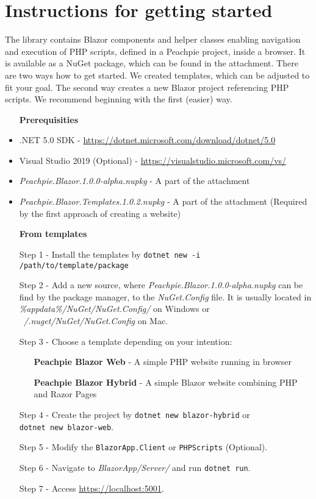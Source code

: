 \chapter{Instructions for getting started}

The library contains Blazor components and helper classes enabling navigation and execution of PHP scripts, defined in a Peachpie project, inside a browser. 
It is available as a NuGet package, which can be found in the attachment. 
There are two ways how to get started. We created templates, which can be adjusted to fit your goal. 
The second way creates a new Blazor project referencing PHP scripts. 
We recommend beginning with the first (easier) way.
\par
\begin{itemize}
\item [\textbf{Prerequisities}]
\item .NET 5.0 SDK - \url{https://dotnet.microsoft.com/download/dotnet/5.0}
\item Visual Studio 2019 (Optional) - \url{https://visualstudio.microsoft.com/vs/}
\item \textit{Peachpie.Blazor.1.0.0-alpha.nupkg} - A part of the attachment
\item \textit{Peachpie.Blazor.Templates.1.0.2.nupkg} - A part of the attachment (Required by the first approach of creating a website)
\end{itemize}
\par
\begin{itemize}
\item [\textbf{From templates}]
\item [Step 1 -] Install the templates by \texttt{dotnet new -i /path/to/template/package}
\item [Step 2 -] Add a new source, where \textit{Peachpie.Blazor.1.0.0-alpha.nupkg} can be find by the package manager, to the \textit{NuGet.Config} file. It is usually located in \textit{\%appdata\%/NuGet/NuGet.Config/} on Windows or \textit{~/.nuget/NuGet/Nu\-Get.Config} on Mac.
\item [Step 3 -] Choose a template depending on your intention:
\begin{itemize}
\item [\textbf{Peachpie Blazor Web} -] A simple PHP website running in browser
\item [\textbf{Peachpie Blazor Hybrid} -] A simple Blazor website combining PHP and Razor Pages
\end{itemize}
\item [Step 4 -] Create the project by \texttt{dotnet new blazor-hybrid} or\\ \texttt{dotnet new blazor-web}.
\item [Step 5 -] Modify the \texttt{BlazorApp.Client} or \texttt{PHPScripts} (Optional).
\item [Step 6 -] Navigate to \textit{BlazorApp/Server/} and run \texttt{dotnet run}.
\item [Step 7 -] Access \url{https://localhost:5001}.
\end{itemize}
